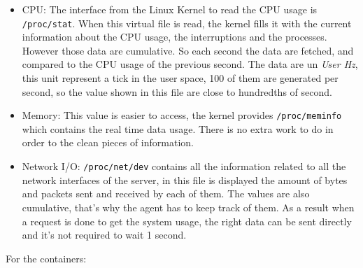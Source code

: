 \begin{itemize}
\item{CPU: The interface from the Linux Kernel to read the CPU usage is
\texttt{/proc/stat}. When this virtual file is read, the kernel fills it with
the current information about the CPU usage, the interruptions and the
processes. However those data are cumulative. So each second the data are
fetched, and compared to the CPU usage of the previous second. The data are un
\textit{User Hz}, this unit represent a tick in the user space, 100 of them are
generated per second, so the value shown in this file are close to hundredths of
second.} \item{Memory: This value is easier to access, the kernel provides
\texttt{/proc/meminfo} which contains the real time data usage. There is no
extra work to do in order to the clean pieces of information.} \item{Network
I/O: \texttt{/proc/net/dev} contains all the information related to all the
network interfaces of the server, in this file is displayed the amount of bytes
and packets sent and received by each of them. The values are also cumulative,
that's why the agent has to keep track of them. As a result when a request is
done to get the system usage, the right data can be sent directly and it's not
required to wait 1 second.}
\end{itemize}

For the containers:

